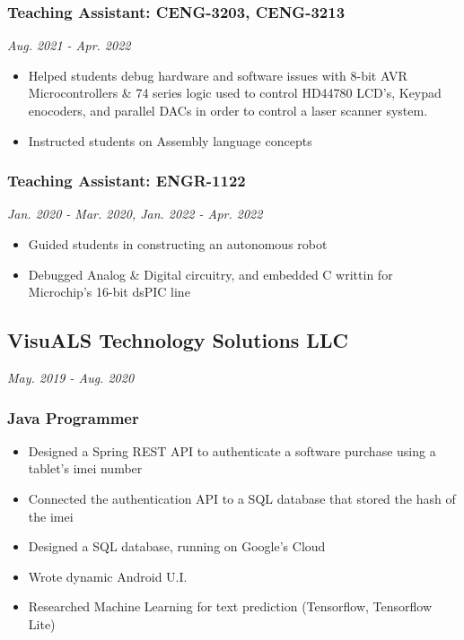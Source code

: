 \documentclass{article}
\begin{document}
\begin{spacing}{.5}
		\subsubsection{\small{Teaching Assistant: CENG-3203, CENG-3213}} \hfill \scriptsize{\textsl{Aug. 2021 - Apr. 2022}}
			\begin{itemize}[label=--,itemsep=-.75ex]
				\item \small{Helped students debug hardware and software issues with 8-bit AVR Microcontrollers \& 74 series logic used to control HD44780 LCD's, Keypad enocoders, and parallel DACs in order to control a laser scanner system.}
				\item \small{Instructed students on Assembly language concepts}
			\end{itemize}
		\subsubsection{\small{Teaching Assistant: ENGR-1122}} \hfill \scriptsize{\textsl{Jan. 2020 - Mar. 2020, Jan. 2022 - Apr. 2022}}
			\begin{itemize}[label=--,itemsep=-.75ex]
				\item \small{Guided students in constructing an autonomous robot}
				\item \small{Debugged Analog \& Digital circuitry, and embedded C writtin for Microchip's 16-bit dsPIC line}
			\end{itemize}
	\subsection{VisuALS Technology Solutions LLC} \hfill \scriptsize{\textsl{May. 2019 - Aug. 2020}}
		\subsubsection{\small{Java Programmer}}
			\begin{itemize}[label=--,itemsep=-.75ex]
				\item \small{Designed a Spring REST API to authenticate a software purchase using a tablet's imei number}
				\item \small{Connected the authentication API to a SQL database that stored the hash of the imei}
				\item \small{Designed a SQL database, running on Google's Cloud}
				\item \small{Wrote dynamic Android U.I.}
				\item \small{Researched Machine Learning for text prediction} \scriptsize{(Tensorflow, Tensorflow Lite)}
			\end{itemize}


\end{spacing}
\end{document}
